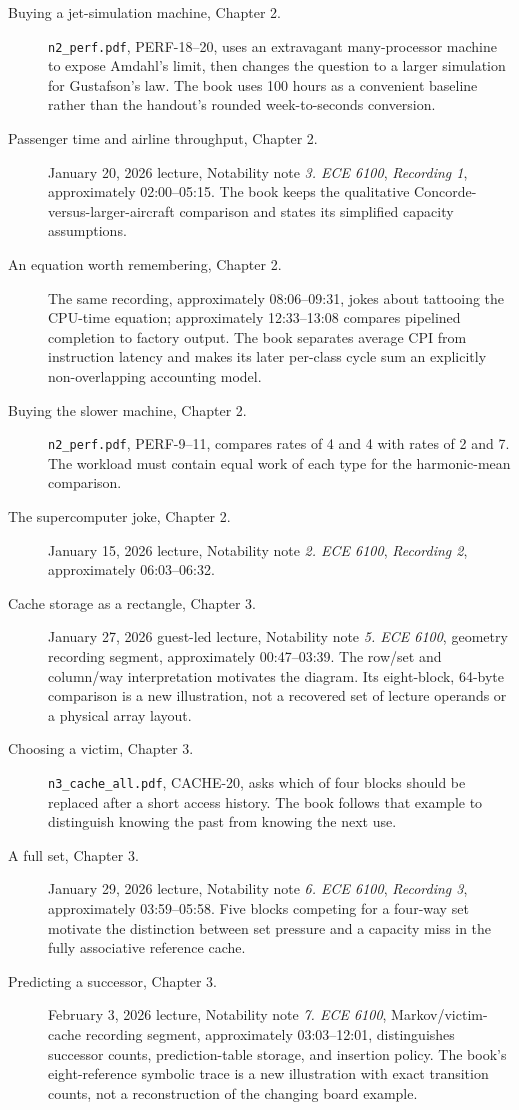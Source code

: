 \begin{description}
  \item[Buying a jet-simulation machine, Chapter 2.] \texttt{n2\_perf.pdf}, PERF-18--20, uses an extravagant many-processor machine to expose Amdahl's limit, then changes the question to a larger simulation for Gustafson's law. The book uses 100 hours as a convenient baseline rather than the handout's rounded week-to-seconds conversion.
  \item[Passenger time and airline throughput, Chapter 2.] January 20, 2026 lecture, Notability note \emph{3. ECE 6100}, \emph{Recording 1}, approximately 02:00--05:15. The book keeps the qualitative Concorde-versus-larger-aircraft comparison and states its simplified capacity assumptions.
  \item[An equation worth remembering, Chapter 2.] The same recording, approximately 08:06--09:31, jokes about tattooing the CPU-time equation; approximately 12:33--13:08 compares pipelined completion to factory output. The book separates average CPI from instruction latency and makes its later per-class cycle sum an explicitly non-overlapping accounting model.
  \item[Buying the slower machine, Chapter 2.] \texttt{n2\_perf.pdf}, PERF-9--11, compares rates of 4 and 4 with rates of 2 and 7. The workload must contain equal work of each type for the harmonic-mean comparison.
  \item[The supercomputer joke, Chapter 2.] January 15, 2026 lecture, Notability note \emph{2. ECE 6100}, \emph{Recording 2}, approximately 06:03--06:32.
  \item[Cache storage as a rectangle, Chapter 3.] January 27, 2026 guest-led lecture, Notability note \emph{5. ECE 6100}, geometry recording segment, approximately 00:47--03:39. The row/set and column/way interpretation motivates the diagram. Its eight-block, 64-byte comparison is a new illustration, not a recovered set of lecture operands or a physical array layout.
  \item[Choosing a victim, Chapter 3.] \texttt{n3\_cache\_all.pdf}, CACHE-20, asks which of four blocks should be replaced after a short access history. The book follows that example to distinguish knowing the past from knowing the next use.
  \item[A full set, Chapter 3.] January 29, 2026 lecture, Notability note \emph{6. ECE 6100}, \emph{Recording 3}, approximately 03:59--05:58. Five blocks competing for a four-way set motivate the distinction between set pressure and a capacity miss in the fully associative reference cache.
  \item[Predicting a successor, Chapter 3.] February 3, 2026 lecture, Notability note \emph{7. ECE 6100}, Markov/victim-cache recording segment, approximately 03:03--12:01, distinguishes successor counts, prediction-table storage, and insertion policy. The book's eight-reference symbolic trace is a new illustration with exact transition counts, not a reconstruction of the changing board example.

\end{description}
